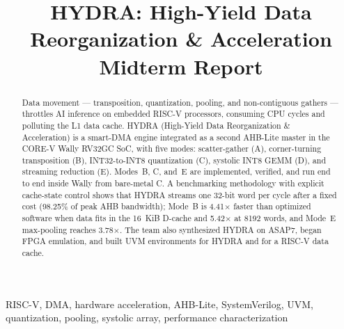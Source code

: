 \documentclass[conference]{IEEEtran}
\begin{document}
\title{
    HYDRA: High-Yield Data Reorganization \& Acceleration\\
    \large Midterm Report \\
}
\author{
}
\maketitle
\begin{abstract}
    Data movement --- transposition, quantization, pooling, and
    non-contiguous gathers --- throttles AI inference on embedded RISC-V
    processors, consuming CPU cycles and polluting the L1 data cache.
    HYDRA (High-Yield Data Reorganization \& Acceleration) is a smart-DMA
    engine integrated as a second AHB-Lite master in the CORE-V Wally
    RV32GC SoC, with five modes: scatter-gather (A), corner-turning
    transposition (B), INT32-to-INT8 quantization (C), systolic INT8 GEMM
    (D), and streaming reduction (E). Modes~B, C, and~E are implemented,
    verified, and run end to end inside Wally from bare-metal C. A
    benchmarking methodology with explicit cache-state control shows that
    HYDRA streams one 32-bit word per cycle after a fixed cost
    (98.25\% of peak AHB bandwidth); Mode~B is 4.41$\times$ faster than
    optimized software when data fits in the 16~KiB D-cache and
    5.42$\times$ at 8192 words, and Mode~E max-pooling reaches
    3.78$\times$. The team also synthesized HYDRA on ASAP7, began FPGA
    emulation, and built UVM environments for HYDRA and for a RISC-V data
    cache.
\end{abstract}
\begin{IEEEkeywords}
    RISC-V, DMA, hardware acceleration, AHB-Lite, SystemVerilog, UVM,
    quantization, pooling, systolic array, performance characterization
\end{IEEEkeywords}
\end{document}
